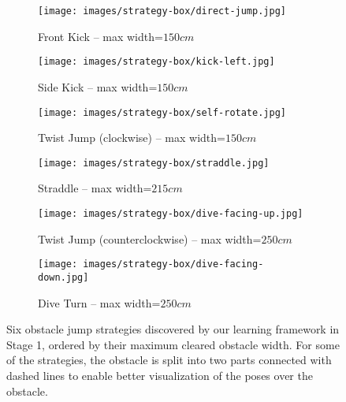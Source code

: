 \begin{figure}
    \centering
    \begin{subfigure}[b]{0.99\linewidth}
        \texttt{[image: images/strategy-box/direct-jump.jpg]}
        \caption{Front Kick -- max width=$150cm$}
        \label{fig:obstacle-frontKick}
    \end{subfigure}
    \begin{subfigure}[b]{0.99\linewidth}
        \texttt{[image: images/strategy-box/kick-left.jpg]}
        \caption{Side Kick -- max width=$150cm$ }
        \label{fig:obstacle-sideKick}
    \end{subfigure}
    \begin{subfigure}[b]{0.99\linewidth}
        \texttt{[image: images/strategy-box/self-rotate.jpg]}
        \caption{Twist Jump (clockwise) -- max width=$150cm$}
        \label{fig:obstacle-twistJumpC}
    \end{subfigure}
    \begin{subfigure}[b]{0.99\linewidth}
        \texttt{[image: images/strategy-box/straddle.jpg]}
        \caption{ Straddle -- max width=$215cm$}
        \label{fig:obstacle-straddle}
    \end{subfigure}
    \begin{subfigure}[b]{0.99\linewidth}
        \texttt{[image: images/strategy-box/dive-facing-up.jpg]}
        \caption{Twist Jump (counterclockwise) -- max width=$250cm$}
        \label{fig:obstacle-twistJumpCC}
    \end{subfigure}
    \begin{subfigure}[b]{0.99\linewidth}
        \texttt{[image: images/strategy-box/dive-facing-down.jpg]}
        \caption{Dive Turn -- max width=$250cm$ }
        \label{fig:obstacle-diveTurn}
    \end{subfigure}
    \caption{Six obstacle jump strategies discovered by our learning framework in Stage 1, ordered by their maximum cleared obstacle width. For some of the strategies, the obstacle is split into two parts connected with dashed lines to enable better visualization of the poses over the obstacle.}
    \label{fig:obstacleJumps1}
\end{figure}
